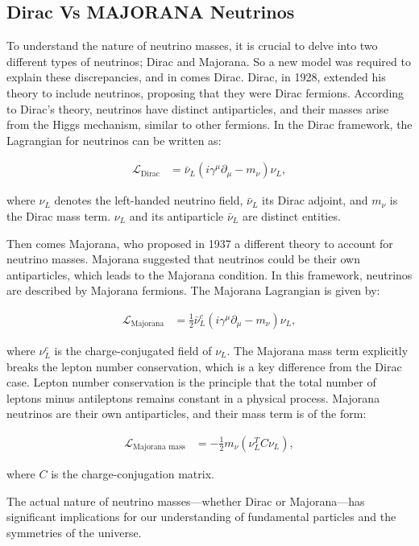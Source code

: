 \subsection{Dirac Vs MAJORANA Neutrinos}

To understand the nature of neutrino masses, it is crucial to delve into two different types of neutrinos; Dirac and Majorana.
So a new model was required to explain these discrepancies, and in comes Dirac.
Dirac, in 1928, extended his theory to include neutrinos, proposing that they were Dirac fermions.
According to Dirac's theory, neutrinos have distinct antiparticles, and their masses arise from the Higgs mechanism, similar to other fermions.
In the Dirac framework, the Lagrangian for neutrinos can be written as:

\begin{align}
  \mathcal{L}_{\text{Dirac}} &= \bar{\nu}_L (i\gamma^\mu \partial_\mu - m_\nu) \nu_L ,
\end{align}

where \(\nu_L\) denotes the left-handed neutrino field, \(\bar{\nu}_L\) its Dirac adjoint, and \(m_\nu\) is the Dirac mass term.
\(\nu_L\) and its antiparticle \(\bar{\nu}_L\) are distinct entities.

Then comes Majorana, who proposed in 1937 a different theory to account for neutrino masses.
Majorana suggested that neutrinos could be their own antiparticles, which leads to the Majorana condition.
In this framework, neutrinos are described by Majorana fermions.
The Majorana Lagrangian is given by:

\begin{align}
  \mathcal{L}_{\text{Majorana}} &= \frac{1}{2} \bar{\nu}_L^c (i\gamma^\mu \partial_\mu - m_\nu) \nu_L ,
\end{align}

where \(\nu_L^c\) is the charge-conjugated field of \(\nu_L\).
The Majorana mass term explicitly breaks the lepton number conservation, which is a key difference from the Dirac case.
Lepton number conservation is the principle that the total number of leptons minus antileptons remains constant in a physical process.
Majorana neutrinos are their own antiparticles, and their mass term is of the form:

\begin{align}
  \mathcal{L}_{\text{Majorana mass}} &= -\frac{1}{2} m_\nu (\nu_L^T C \nu_L ),
\end{align}

where \(C\) is the charge-conjugation matrix.


The actual nature of neutrino masses—whether Dirac or Majorana—has significant implications for our understanding of fundamental particles and the symmetries of the universe.
